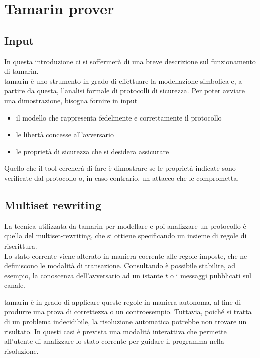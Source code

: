 \section{Tamarin prover}

\subsection{Input}

In questa introduzione ci si soffermerà di una breve descrizione sul funzionamento di \gls{tamarin}. \\
\gls{tamarin} è uno strumento in grado di effettuare la modellazione simbolica e, a partire da questa, l'analisi formale di protocolli di sicurezza.
Per poter avviare una dimostrazione, bisogna fornire in input
\begin{itemize}
    \item il modello che rappresenta fedelmente e correttamente il protocollo
    \item le libertà concesse all'avversario
    \item le proprietà di sicurezza che si desidera assicurare
\end{itemize}
Quello che il tool cercherà di fare è dimostrare se le proprietà indicate sono verificate dal protocollo o, in caso contrario, un attacco che le comprometta. \\

\subsection{Multiset rewriting}
La tecnica utilizzata da \gls{tamarin} per modellare e poi analizzare un protocollo è quella del \gls{multiset-rewriting}, che si ottiene specificando un insieme di regole di riscrittura. \\

Lo stato corrente viene alterato in maniera coerente alle regole imposte, che ne definiscono le modalità di transazione.
Consultando è possibile stabilire, ad esempio, la conoscenza dell'avversario ad un istante $t$ o i messaggi pubblicati sul canale.

\gls{tamarin} è in grado di applicare queste regole in maniera autonoma, al fine di produrre una prova di correttezza o un controesempio.
Tuttavia, poiché si tratta di un problema indecidibile, la risoluzione automatica potrebbe non trovare un risultato.
In questi casi è prevista una modalità interattiva che permette all'utente di analizzare lo stato corrente per guidare il programma nella risoluzione.